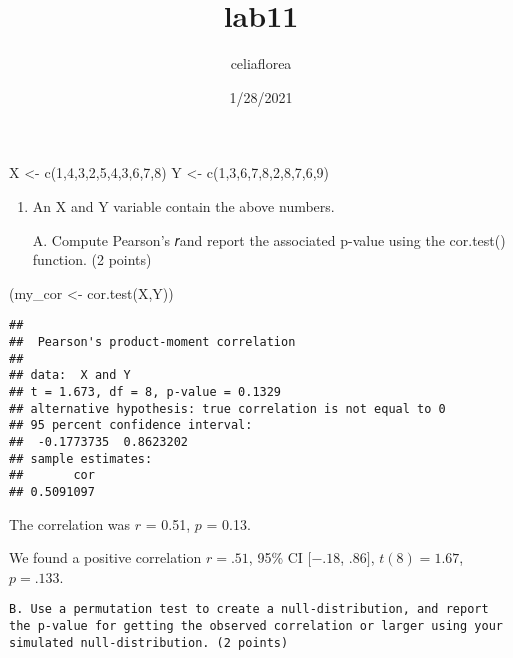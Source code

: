 \documentclass[
]{article}
\title{lab11}
\author{celiaflorea}
\date{1/28/2021}
\newenvironment{Shaded}{\begin{snugshade}}{\end{snugshade}}
\newcommand{\DecValTok}[1]{\textcolor[rgb]{0.00,0.00,0.81}{#1}}
\newcommand{\FunctionTok}[1]{\textcolor[rgb]{0.00,0.00,0.00}{#1}}
\newcommand{\NormalTok}[1]{#1}
\newcommand{\OtherTok}[1]{\textcolor[rgb]{0.56,0.35,0.01}{#1}}
\begin{document}
\maketitle

\begin{Shaded}
\begin{Highlighting}[]
\NormalTok{X }\OtherTok{\textless{}{-}} \FunctionTok{c}\NormalTok{(}\DecValTok{1}\NormalTok{,}\DecValTok{4}\NormalTok{,}\DecValTok{3}\NormalTok{,}\DecValTok{2}\NormalTok{,}\DecValTok{5}\NormalTok{,}\DecValTok{4}\NormalTok{,}\DecValTok{3}\NormalTok{,}\DecValTok{6}\NormalTok{,}\DecValTok{7}\NormalTok{,}\DecValTok{8}\NormalTok{)}
\NormalTok{Y }\OtherTok{\textless{}{-}} \FunctionTok{c}\NormalTok{(}\DecValTok{1}\NormalTok{,}\DecValTok{3}\NormalTok{,}\DecValTok{6}\NormalTok{,}\DecValTok{7}\NormalTok{,}\DecValTok{8}\NormalTok{,}\DecValTok{2}\NormalTok{,}\DecValTok{8}\NormalTok{,}\DecValTok{7}\NormalTok{,}\DecValTok{6}\NormalTok{,}\DecValTok{9}\NormalTok{)}
\end{Highlighting}
\end{Shaded}

\begin{enumerate}
\def\labelenumi{\arabic{enumi}.}
\item
  An X and Y variable contain the above numbers.

  A. Compute Pearson's 𝑟and report the associated p-value using the
  cor.test() function. (2 points)
\end{enumerate}

\begin{Shaded}
\begin{Highlighting}[]
\NormalTok{(my\_cor }\OtherTok{\textless{}{-}} \FunctionTok{cor.test}\NormalTok{(X,Y))}
\end{Highlighting}
\end{Shaded}

\begin{verbatim}
## 
##  Pearson's product-moment correlation
## 
## data:  X and Y
## t = 1.673, df = 8, p-value = 0.1329
## alternative hypothesis: true correlation is not equal to 0
## 95 percent confidence interval:
##  -0.1773735  0.8623202
## sample estimates:
##       cor 
## 0.5091097
\end{verbatim}

The correlation was \(r\) = 0.51, \(p\) = 0.13.

We found a positive correlation \(r = .51\), 95\% CI \([-.18\),
\(.86]\), \(t(8) = 1.67\), \(p = .133\).

\begin{verbatim}
B. Use a permutation test to create a null-distribution, and report the p-value for getting the observed correlation or larger using your simulated null-distribution. (2 points)
\end{verbatim}
\end{document}

